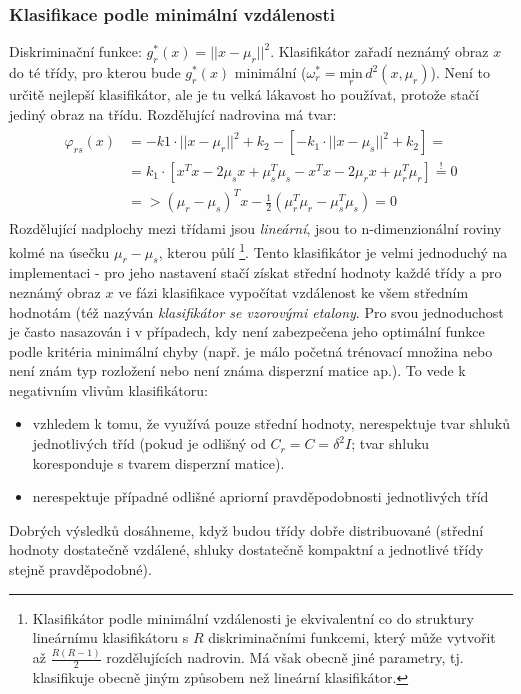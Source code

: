 \subsubsection*{Klasifikace podle minimální vzdálenosti}
Diskriminační funkce: $ g_r^*(x) = || x-\mu_r ||^2 $. Klasifikátor zařadí neznámý obraz $ x $ do té třídy, pro kterou bude $ g_r^*(x) $ minimální ($ \omega_r^* = \underset{r}{\mathrm{min}} \, d^2(x, \mu_r) $). Není to určitě nejlepší klasifikátor, ale je tu velká lákavost ho používat, protože stačí jediný obraz na třídu. Rozdělující nadrovina má tvar:
\begin{align}
\begin{split}
\varphi_{rs}(x) &= -k1 \cdot || x-\mu_r ||^2 + k_2 - \left[-k_1 \cdot || x-\mu_s ||^2 + k_2 \right] = \\
&= k_1 \cdot \left[x^Tx - 2\mu_sx + \mu_s^T\mu_s - x^Tx - 2\mu_rx + \mu_r^T\mu_r\right] \overset{!}{=} 0 \\
&=> (\mu_r - \mu_s)^T x - \frac{1}{2}(\mu_r^T\mu_r - \mu_s^T\mu_s) = 0
\end{split}
\end{align}
Rozdělující nadplochy mezi třídami jsou \textit{lineární}, jsou to n-dimenzionální roviny kolmé na úsečku $ \mu_r - \mu_s $, kterou půlí \footnote{Klasifikátor podle minimální vzdálenosti je ekvivalentní co do struktury lineárnímu klasifikátoru s $ R $ diskriminačními funkcemi, který může vytvořit až $ \frac{R (R-1)}{2} $ rozdělujících nadrovin. Má však obecně jiné parametry, tj. klasifikuje obecně jiným způsobem než lineární klasifikátor.}. Tento klasifikátor je velmi jednoduchý na implementaci - pro jeho nastavení stačí získat střední hodnoty každé třídy a pro neznámý obraz $ x $ ve fázi klasifikace vypočítat vzdálenost ke všem středním hodnotám (též nazýván \textit{klasifikátor se vzorovými etalony}. Pro svou jednoduchost je často nasazován i v případech, kdy není zabezpečena jeho optimální funkce podle kritéria minimální chyby (např. je málo početná trénovací množina nebo není znám typ rozložení nebo není známa disperzní matice ap.). To vede k negativním vlivům klasifikátoru:
\begin{itemize}
\item vzhledem k tomu, že využívá pouze střední hodnoty, nerespektuje tvar shluků jednotlivých tříd (pokud je odlišný od $ C_r = C = \delta^2 I $; tvar shluku koresponduje s tvarem disperzní matice).
\item nerespektuje případné odlišné apriorní pravděpodobnosti jednotlivých tříd
\end{itemize}
Dobrých výsledků dosáhneme, když budou třídy dobře distribuované (střední hodnoty dostatečně vzdálené, shluky dostatečně kompaktní a jednotlivé třídy stejně pravděpodobné).

